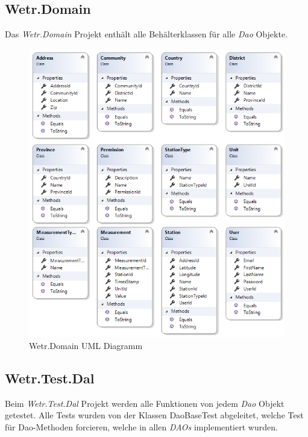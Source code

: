 \newpage
\subsection{Wetr.Domain}
Das \textit{Wetr.Domain} Projekt enthält alle Behälterklassen für alle \textit{Dao} Objekte.

\begin{figure}[H]
\centering
\includegraphics[width=.9\textwidth]{pictures/Wetr_Domain.png}
\caption{Wetr.Domain UML Diagramm}
\label{fig:Wetr.Domain}
\end{figure}
\raggedright

\newpage
\subsection{Wetr.Test.Dal}
Beim \textit{Wetr.Test.Dal} Projekt werden alle Funktionen von jedem \textit{Dao} Objekt getestet. Alle Tests wurden von der Klassen DaoBaseTest abgeleitet, welche Test für Dao-Methoden forcieren, welche in allen \textit{DAOs} implementiert wurden. 

